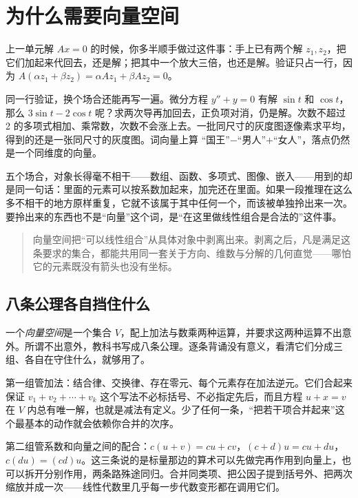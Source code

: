 \section{为什么需要向量空间}
\label{sec:03-Linear-Algebra/02-Vector-Spaces/01}

上一单元解 \(Ax=0\) 的时候，你多半顺手做过这件事：手上已有两个解 \(z_1,z_2\)，把它们加起来代回去，还是解；把其中一个放大三倍，也还是解。验证只占一行，因为 \(A(\alpha z_1+\beta z_2)=\alpha Az_1+\beta Az_2=0\)。

同一行验证，换个场合还能再写一遍。微分方程 \(y''+y=0\) 有解 \(\sin t\) 和 \(\cos t\)，那么 \(3\sin t-2\cos t\) 呢？求两次导再加回去，正负项对消，仍是解。次数不超过 2 的多项式相加、乘常数，次数不会涨上去。一批同尺寸的灰度图逐像素求平均，得到的还是一张同尺寸的灰度图。词向量上算 ``国王''\(-\)``男人''\(+\)``女人''，落点仍然是一个同维度的向量。

五个场合，对象长得毫不相干——数组、函数、多项式、图像、嵌入——用到的却是同一句话：里面的元素可以按系数加起来，加完还在里面。如果一段推理在这么多不相干的地方原样重复，它就不该属于其中任何一个，而该被单独拎出来一次。要拎出来的东西也不是``向量''这个词，是``在这里做线性组合是合法的''这件事。

\begin{quote}
向量空间把``可以线性组合''从具体对象中剥离出来。剥离之后，凡是满足这条要求的集合，都能共用同一套关于方向、维数与分解的几何直觉——哪怕它的元素既没有箭头也没有坐标。
\end{quote}

\subsection{八条公理各自挡住什么}

一个\emph{向量空间}是一个集合 \(V\)，配上加法与数乘两种运算，并要求这两种运算不出意外。所谓不出意外，教科书写成八条公理。逐条背诵没有意义，看清它们分成三组、各自在守住什么，就够用了。

第一组管加法：结合律、交换律、存在零元、每个元素存在加法逆元。它们合起来保证 \(v_1+v_2+\cdots+v_k\) 这个写法不必标括号、不必指定先后，而且方程 \(u+x=v\) 在 \(V\) 内总有唯一解，也就是减法有定义。少了任何一条，``把若干项合并起来''这个最基本的动作就会依赖你合并的次序。

第二组管系数和向量之间的配合：\(c(u+v)=cu+cv\)，\((c+d)u=cu+du\)，\(c(du)=(cd)u\)。这三条说的是标量那边的算术可以先做完再作用到向量上，也可以拆开分别作用，两条路殊途同归。合并同类项、把公因子提到括号外、把两次缩放并成一次——线性代数里几乎每一步代数变形都在调用它们。

